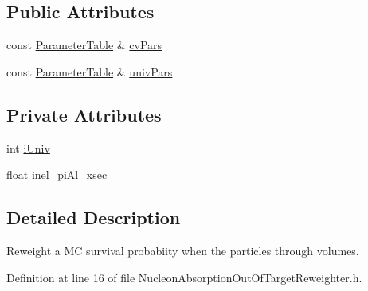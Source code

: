 \subsection*{Public Attributes}
\begin{DoxyCompactItemize}
\item 
const \hyperlink{class_neutrino_flux_reweight_1_1_parameter_table}{Parameter\-Table} \& \hyperlink{class_neutrino_flux_reweight_1_1_nucleon_absorption_out_of_target_reweighter_a15ea8c8b728192f7f61f2f7a503ea523}{cv\-Pars}
\item 
const \hyperlink{class_neutrino_flux_reweight_1_1_parameter_table}{Parameter\-Table} \& \hyperlink{class_neutrino_flux_reweight_1_1_nucleon_absorption_out_of_target_reweighter_afc305487c13ad3506ef55909e4e844ac}{univ\-Pars}
\end{DoxyCompactItemize}
\subsection*{Private Attributes}
\begin{DoxyCompactItemize}
\item 
int \hyperlink{class_neutrino_flux_reweight_1_1_nucleon_absorption_out_of_target_reweighter_a2b89b90d5bbc264d931574f752a51b7b}{i\-Univ}
\item 
float \hyperlink{class_neutrino_flux_reweight_1_1_nucleon_absorption_out_of_target_reweighter_a6e402e4d30132d0ccc65bc74e5add535}{inel\-\_\-pi\-Al\-\_\-xsec}
\end{DoxyCompactItemize}


\subsection{Detailed Description}
Reweight a M\-C survival probabiity when the particles through volumes. 

Definition at line 16 of file Nucleon\-Absorption\-Out\-Of\-Target\-Reweighter.\-h.




